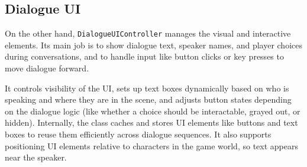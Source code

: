 \subsection{Dialogue UI}
On the other hand, \verb|DialogueUIController| manages the visual and interactive elements. Its main job is to show dialogue text, speaker names, and player choices during conversations, and to handle input like button clicks or key presses to move dialogue forward.

It controls visibility of the UI, sets up text boxes dynamically based on who is speaking and where they are in the scene, and adjusts button states depending on the dialogue logic (like whether a choice should be interactable, grayed out, or hidden). Internally, the class caches and stores UI elements like buttons and text boxes to reuse them efficiently across dialogue sequences. It also supports positioning UI elements relative to characters in the game world, so text appears near the speaker.

 